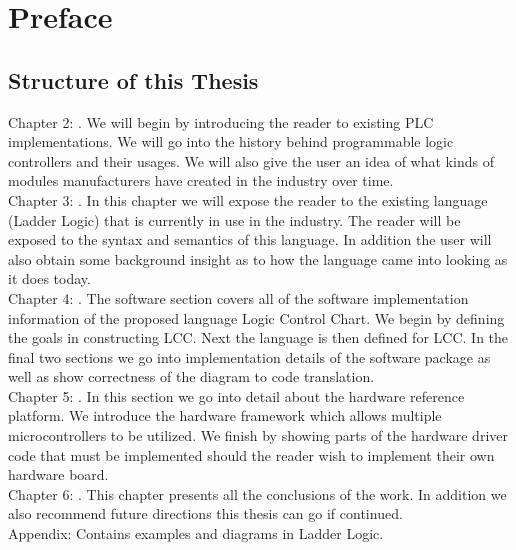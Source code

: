 
\chapter{Preface}

\section{Structure of this Thesis}

\noindent
Chapter 2: . We will begin by introducing the reader to existing PLC implementations. We will go into the history behind programmable logic controllers and their usages. We will also give the user an idea of what kinds of modules manufacturers have created in the industry over time.
\\

\noindent
Chapter 3: . In this chapter we will expose the reader to the existing language (Ladder Logic) that is currently in use in the industry. The reader will be exposed to the syntax and semantics of this language. In addition the user will also obtain some background insight as to how the language came into looking as it does today.
\\

\noindent
Chapter 4: . The software section covers all of the software implementation information of the proposed language Logic Control Chart. We begin by defining the goals in constructing LCC. Next the language is then defined for LCC. In the final two sections we go into implementation details of the software package as well as show correctness of the diagram to code translation.
\\

\noindent
Chapter 5: . In this section we go into detail about the hardware reference platform. We introduce the hardware framework which allows multiple microcontrollers to be utilized. We finish by showing parts of the hardware driver code that must be implemented should the reader wish to implement their own hardware board.
\\

\noindent
Chapter 6: . This chapter presents all the conclusions of the work. In addition we also recommend future directions this thesis can go if continued.
\\

\noindent
Appendix: Contains examples and diagrams in Ladder Logic.